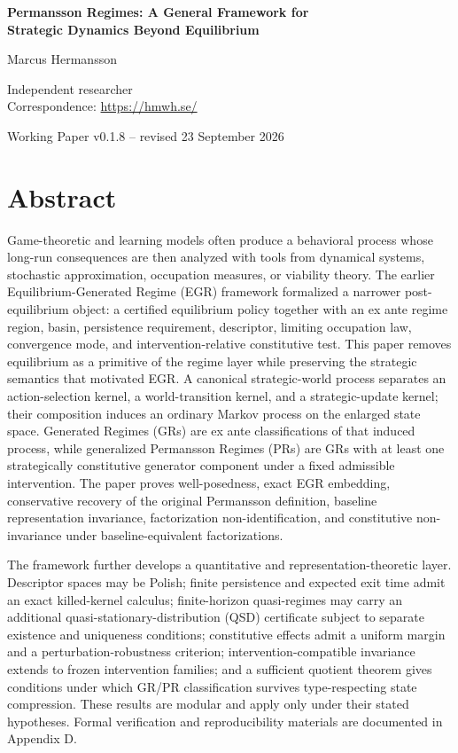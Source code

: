 \documentclass[10pt]{article}
\newcommand{\PaperVersion}{v0.1.8}
\newcommand{\PaperDate}{23 September 2026}
\begin{document}
\begin{center}
{\LARGE\bfseries Permansson Regimes: A General Framework for\\[2pt] Strategic Dynamics Beyond Equilibrium\par}
\vspace{8pt}
{\large Marcus Hermansson\par}
{\small Independent researcher\\Correspondence: \url{https://hmwh.se/}\par}
\vspace{4pt}
{\small Working Paper \PaperVersion{} -- revised \PaperDate\par}
\end{center}
\vspace{3pt}
\section*{Abstract}\label{abstract}

Game-theoretic and learning models often produce a behavioral process whose long-run consequences are then analyzed with tools from dynamical systems, stochastic approximation, occupation measures, or viability theory. The earlier Equilibrium-Generated Regime (EGR) framework formalized a narrower post-equilibrium object: a certified equilibrium policy together with an ex ante regime region, basin, persistence requirement, descriptor, limiting occupation law, convergence mode, and intervention-relative constitutive test. This paper removes equilibrium as a primitive of the regime layer while preserving the strategic semantics that motivated EGR. A canonical strategic-world process separates an action-selection kernel, a world-transition kernel, and a strategic-update kernel; their composition induces an ordinary Markov process on the enlarged state space. Generated Regimes (GRs) are ex ante classifications of that induced process, while generalized Permansson Regimes (PRs) are GRs with at least one strategically constitutive generator component under a fixed admissible intervention. The paper proves well-posedness, exact EGR embedding, conservative recovery of the original Permansson definition, baseline representation invariance, factorization non-identification, and constitutive non-invariance under baseline-equivalent factorizations.

The framework further develops a quantitative and representation-theoretic layer. Descriptor spaces may be Polish; finite persistence and expected exit time admit an exact killed-kernel calculus; finite-horizon quasi-regimes may carry an additional quasi-stationary-distribution (QSD) certificate subject to separate existence and uniqueness conditions; constitutive effects admit a uniform margin and a perturbation-robustness criterion; intervention-compatible invariance extends to frozen intervention families; and a sufficient quotient theorem gives conditions under which GR/PR classification survives type-respecting state compression. These results are modular and apply only under their stated hypotheses. Formal verification and reproducibility materials are documented in Appendix D.
\end{document}
